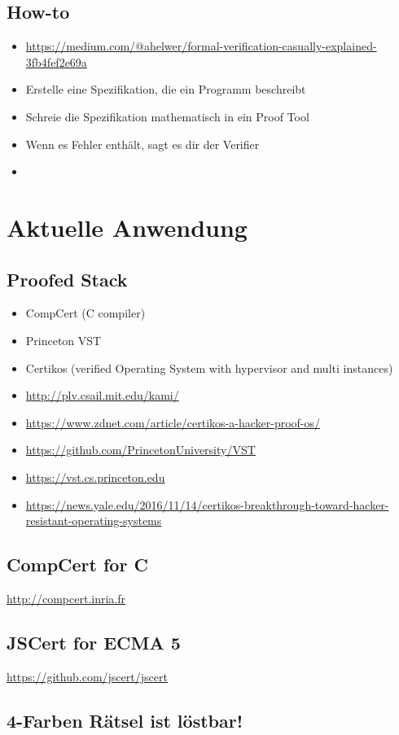 \subsection{How-to}
\begin{itemize}
	\item \url{https://medium.com/@ahelwer/formal-verification-casually-explained-3fb4fef2e69a}
	\item Erstelle eine Spezifikation, die ein Programm beschreibt
	\item Schreie die Spezifikation mathematisch in ein Proof Tool
	\item Wenn es Fehler enthält, sagt es dir der Verifier
	\item 
\end{itemize}

\section{Aktuelle Anwendung}
\subsection{Proofed Stack}
\begin{itemize}
	\item CompCert (C compiler)
	\item Princeton VST
	\item Certikos (verified Operating System with hypervisor and multi instances)
	\item \url{http://plv.csail.mit.edu/kami/}
	\item \url{https://www.zdnet.com/article/certikos-a-hacker-proof-os/}
	\item \url{https://github.com/PrincetonUniversity/VST}
	\item \url{https://vst.cs.princeton.edu}
	\item \url{https://news.yale.edu/2016/11/14/certikos-breakthrough-toward-hacker-resistant-operating-systems}
\end{itemize}
\subsection{CompCert for C}
\url{http://compcert.inria.fr}
\subsection{JSCert for ECMA 5}
\url{https://github.com/jscert/jscert}
\subsection{4-Farben Rätsel ist löstbar!}
